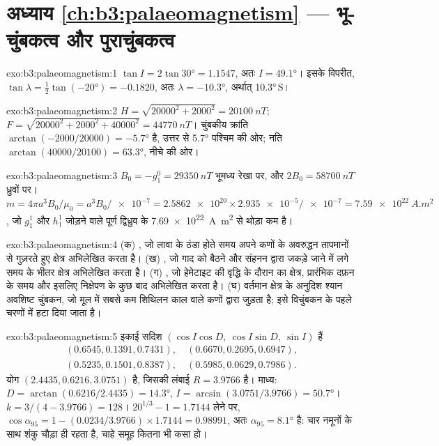 \section*{अध्याय \ref{ch:b3:palaeomagnetism} --- भू-चुंबकत्व और पुराचुंबकत्व}

\begin{solution}{exo:b3:palaeomagnetism:1}
$\tan I = 2\tan\ang{30} = 1.1547$, अतः $I = \ang{49.1}$। इसके विपरीत, $\tan\lambda
= \tfrac12\tan(\ang{-20}) = -0.1820$, अतः $\lambda = \ang{-10.3}$, अर्थात्
\ang{10.3}\,S।
\end{solution}

\begin{solution}{exo:b3:palaeomagnetism:2}
$H = \sqrt{20000^2 + 2000^2} = \qty{20100}{nT}$;
$F = \sqrt{20000^2 + 2000^2 + 40000^2} = \qty{44770}{nT}$। चुंबकीय
क्रांति $\arctan(-2000/20000) = \ang{-5.7}$ है, उत्तर से \ang{5.7} पश्चिम की ओर;
नति $\arctan(40000/20100) = \ang{63.3}$, नीचे की ओर।
\end{solution}

\begin{solution}{exo:b3:palaeomagnetism:3}
$B_0 = -g_1^0 = \qty{29350}{nT}$ भूमध्य रेखा पर, और $2B_0 = \qty{58700}{nT}$
ध्रुवों पर। $m = 4\pi a^3B_0/\mu_0 = a^3B_0/\num{e-7} = \num{2.5862e20}\times
\num{2.935e-5}/\num{e-7} = \qty{7.59e22}{A.m^2}$, जो
$g_1^1$ और $h_1^1$ जोड़ने वाले पूर्ण द्विध्रुव के \qty{7.69e22}{A.m^2} से थोड़ा कम है।
\end{solution}

\begin{solution}{exo:b3:palaeomagnetism:4}
(क) , जो लावा के ठंडा होते समय
अपने कणों के अवरुद्धन तापमानों से गुज़रते हुए क्षेत्र अभिलेखित करता है। (ख) , जो
गाद को बैठने और
संहनन द्वारा जकड़े जाने में लगे समय के भीतर क्षेत्र अभिलेखित करता है। (ग) , जो
हेमेटाइट की वृद्धि के दौरान का क्षेत्र, प्रारंभिक दफ़न के समय और इसलिए
निक्षेपण के कुछ बाद अभिलेखित करता है। (घ) वर्तमान क्षेत्र के अनुदिश श्यान अवशिष्ट चुंबकन, जो
मूल  में सबसे कम शिथिलन काल वाले कणों द्वारा जुड़ता है; इसे
विचुंबकन के पहले चरणों में हटा दिया जाता है।
\end{solution}

\begin{solution}{exo:b3:palaeomagnetism:5}
इकाई सदिश $(\cos I\cos D,\ \cos I\sin D,\ \sin I)$ हैं
\begin{gather*}
  (0.6545, 0.1391, 0.7431),\quad (0.6670, 0.2695, 0.6947),\\
  (0.5235, 0.1501, 0.8387),\quad (0.5985, 0.0629, 0.7986).
\end{gather*}
योग $(2.4435, 0.6216, 3.0751)$ है, जिसकी लंबाई $R = 3.9766$ है। माध्य:
$D = \arctan(0.6216/2.4435) = \ang{14.3}$, $I = \arcsin(3.0751/3.9766) =
\ang{50.7}$। $k = 3/(4 - 3.9766) = 128$। $20^{1/3} - 1 = 1.7144$ लेने पर,
$\cos\alpha_{95} = 1 - (0.0234/3.9766)\times1.7144 = 0.98991$, अतः
$\alpha_{95} = \ang{8.1}$ है: चार नमूनों के साथ शंकु चौड़ा ही रहता है, चाहे
समूह कितना भी कसा हो।
\end{solution}

